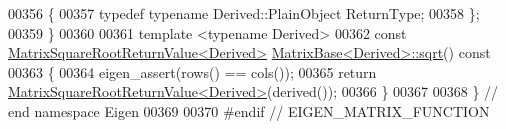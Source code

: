 \begin{DoxyCode}
00356 \{
00357   \textcolor{keyword}{typedef} \textcolor{keyword}{typename} Derived::PlainObject ReturnType;
00358 \};
00359 \}
00360 
00361 \textcolor{keyword}{template} <\textcolor{keyword}{typename} Derived>
00362 \textcolor{keyword}{const} \hyperlink{class_eigen_1_1_matrix_square_root_return_value}{MatrixSquareRootReturnValue<Derived>} 
      \hyperlink{group___core___module_class_eigen_1_1_matrix_base}{MatrixBase<Derived>::sqrt}()\textcolor{keyword}{ const}
00363 \textcolor{keyword}{}\{
00364   eigen\_assert(rows() == cols());
00365   \textcolor{keywordflow}{return} \hyperlink{class_eigen_1_1_matrix_square_root_return_value}{MatrixSquareRootReturnValue<Derived>}(derived());
00366 \}
00367 
00368 \} \textcolor{comment}{// end namespace Eigen}
00369 
00370 \textcolor{preprocessor}{#endif // EIGEN\_MATRIX\_FUNCTION}
\end{DoxyCode}
